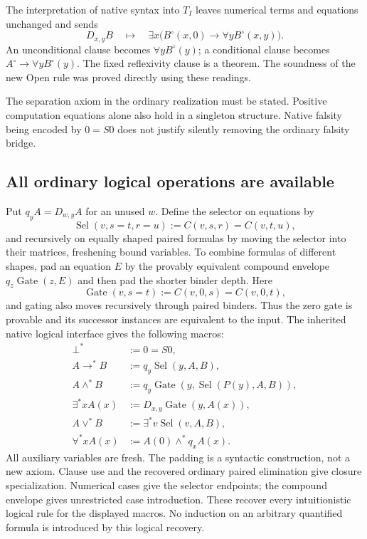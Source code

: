 The interpretation of native syntax into $T_I$ leaves numerical terms and
equations unchanged and sends
\[
 D_{x,y}B\quad\mapsto\quad
 \exists x\bigl(B^\circ(x,0)\to\forall y B^\circ(x,y)\bigr).
\]
An unconditional clause becomes $\forall y B^\circ(y)$; a conditional
clause becomes $A^\circ\to\forall y B^\circ(y)$.  The fixed reflexivity
clause is a theorem.  The soundness of the new Open rule was proved directly
using these readings.

The separation axiom in the ordinary realization must be stated.  Positive
computation equations alone also hold in a singleton structure.  Native
falsity being encoded by $0=S0$ does not justify silently removing the
ordinary falsity bridge.

\subsection{All ordinary logical operations are available}

Put $q_yA=D_{w,y}A$ for an unused $w$.  Define the selector on equations by
\[
 \operatorname{Sel}(v,s=t,r=u)
  := C(v,s,r)=C(v,t,u),
\]
and recursively on equally shaped paired formulas by moving the selector
into their matrices, freshening bound variables.  To combine formulas of
different shapes, pad an equation $E$ by the provably equivalent compound
envelope $q_z\operatorname{Gate}(z,E)$ and then pad the shorter binder
depth.  Here
\[
 \operatorname{Gate}(v,s=t):=C(v,0,s)=C(v,0,t),
\]
and gating also moves recursively through paired binders.  Thus the zero
gate is provable and its successor instances are equivalent to the input.
The inherited native logical interface gives the following macros:
\[
\begin{aligned}
 \bot^* &:=0=S0,\\
 A\to^*B &:=q_y\operatorname{Sel}(y,A,B),\\
 A\wedge^*B &:=q_y\operatorname{Gate}
           (y,\operatorname{Sel}(P(y),A,B)),\\
 \exists^*x A(x)&:=D_{x,y}\operatorname{Gate}(y,A(x)),\\
 A\vee^*B&:=\exists^*v\operatorname{Sel}(v,A,B),\\
 \forall^*x A(x)&:=A(0)\wedge^*q_xA(x).
\end{aligned}
\]
All auxiliary variables are fresh.  The padding is a syntactic
construction, not a new axiom.  Clause use and the recovered ordinary
paired elimination give closure specialization.  Numerical cases give
the selector endpoints; the compound envelope gives unrestricted case
introduction.  These recover every intuitionistic logical rule for the
displayed macros.  No induction on an arbitrary quantified formula is
introduced by this logical recovery.

